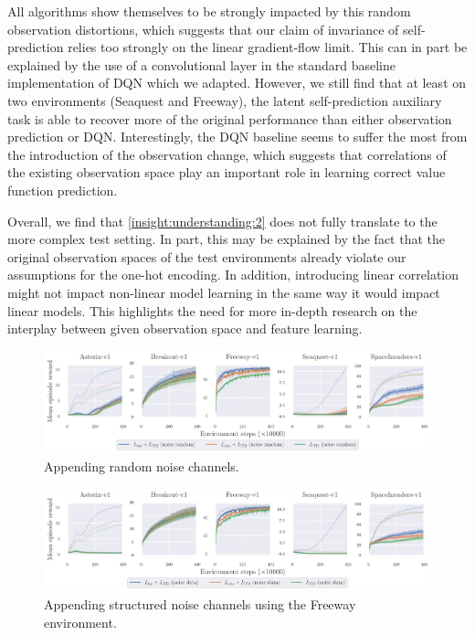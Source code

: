 All algorithms show themselves to be strongly impacted by this random observation distortions, which suggests that our claim of invariance of self-prediction relies too strongly on the linear gradient-flow limit.
This can in part be explained by the use of a convolutional layer in the standard baseline implementation of DQN which we adapted.
However, we still find that at least on two environments (Seaquest and Freeway), the latent self-prediction auxiliary task is able to recover more of the original performance than either observation prediction or DQN.
Interestingly, the DQN baseline seems to suffer the most from the introduction of the observation change, which suggests that correlations of the existing observation space play an important role in learning correct value function prediction.

Overall, we find that \autoref{insight:understanding:2} does not fully translate to the more complex test setting.
In part, this may be explained by the fact that the original observation spaces of the test environments already violate our assumptions for the one-hot encoding.
In addition, introducing linear correlation might not impact non-linear model learning in the same way it would impact linear models.
This highlights the need for more in-depth research on the interplay between given observation space and feature learning.

\begin{figure}[t]
    \centering
    \includegraphics[width=\textwidth]{figures/understanding/rlc2024-noise-random_minatar.pdf}
    \caption{Appending random noise channels.}
    \label{fig:understanding:ran}
\end{figure}

\begin{figure}[t]
    \centering
    \includegraphics[width=\textwidth]{figures/understanding/rlc2024-noise-data_minatar.pdf}
    \caption{Appending structured noise channels using the Freeway environment.}
    \label{fig:understanding:dat}
\end{figure}

